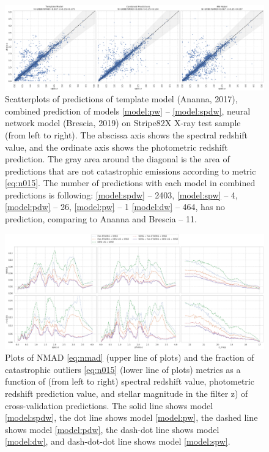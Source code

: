 \documentclass[fleqn,usenatbib]{mnras}
\begin{document}
\begin{figure}
    \centering
    \includegraphics[width=0.9\linewidth]{images/scatterplots-stripe82x-sota-combined.png}
    \caption{Scatterplots of predictions of template model (Ananna, 2017), combined prediction of models \ref{model:pw} -- \ref{model:spdw}, neural network model (Brescia, 2019) on Stripe82X X-ray test sample (from left to right). The abscissa axis shows the spectral redshift value, and the ordinate axis shows the photometric redshift prediction. The gray area around the diagonal is the area of predictions that are not catastrophic emissions according to metric \eqref{eq:n015}. The number of predictions with each model in combined predictions is following: \ref{model:spdw} -- 2403, \ref{model:spw} -- 4, \ref{model:pdw} -- 26, \ref{model:pw} -- 1 \ref{model:dw} -- 464, has no prediction, comparing to Ananna and Brescia -- 11.}
    \label{fig:s82x-sota35}
\end{figure}

\begin{figure}
    \centering
    \includegraphics[width=0.9\linewidth]{images/metrics-cv2-ab-mini.png}
    \caption{Plots of NMAD \eqref{eq:nmad} (upper line of plots) and the fraction of catastrophic outliers \eqref{eq:n015} (lower line of plots) metrics as a function of (from left to right) spectral redshift value, photometric redshift prediction value, and stellar magnitude in the filter z) of cross-validation predictions. The solid line shows model \ref{model:spdw}, the dot line shows model \ref{model:pw}, the dashed line shows model \ref{model:pdw}, the dash-dot line shows model \ref{model:dw}, and dash-dot-dot line shows model \ref{model:spw}.}
    \label{fig:metrics-cv2}
\end{figure}
\end{document}
